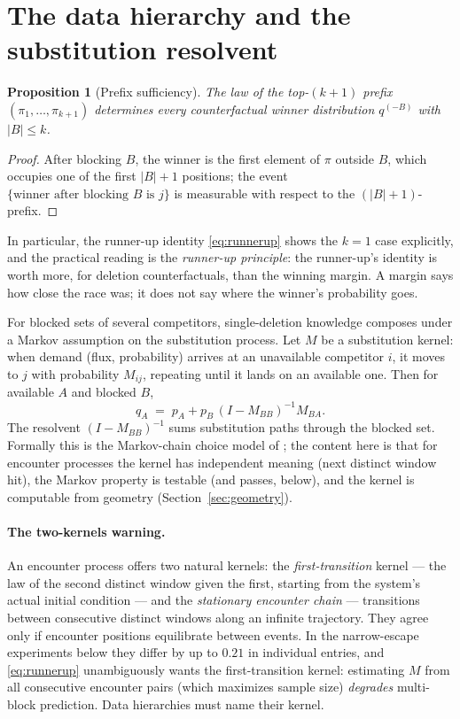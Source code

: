 \documentclass[11pt]{article}
\newtheorem{proposition}{Proposition}
\theoremstyle{remark}
\begin{document}
\section{The data hierarchy and the substitution resolvent}\label{sec:hierarchy}

\begin{proposition}[Prefix sufficiency]\label{prop:prefix}
The law of the top-$(k{+}1)$ prefix $(\pi_1, \dots, \pi_{k+1})$ determines every
counterfactual winner distribution $q^{(-B)}$ with $|B| \le k$.
\end{proposition}

\begin{proof}
After blocking $B$, the winner is the first element of $\pi$ outside $B$, which
occupies one of the first $|B|+1$ positions; the event
$\{\text{winner after blocking } B \text{ is } j\}$ is measurable with respect to
the $(|B|+1)$-prefix.
\end{proof}

In particular, the runner-up identity \eqref{eq:runnerup} shows the $k=1$ case
explicitly, and the practical reading is the \emph{runner-up principle}: the
runner-up's identity is worth more, for deletion counterfactuals, than the winning
margin. A margin says how close the race was; it does not say where the winner's
probability goes.

For blocked sets of several competitors, single-deletion knowledge composes under a
Markov assumption on the substitution process. Let $M$ be a substitution kernel:
when demand (flux, probability) arrives at an unavailable competitor $i$, it moves
to $j$ with probability $M_{ij}$, repeating until it lands on an available one. Then
for available $A$ and blocked $B$,
\begin{equation}
q_A \;=\; p_A + p_B\,(I - M_{BB})^{-1} M_{BA}.
\label{eq:resolvent}
\end{equation}
The resolvent $(I - M_{BB})^{-1}$ sums substitution paths through the blocked set.
Formally this is the Markov-chain choice model of \cite{blanchet2016}; the content
here is that for encounter processes the kernel has independent meaning (next
distinct window hit), the Markov property is testable (and passes, below), and the
kernel is computable from geometry (Section~\ref{sec:geometry}).

\paragraph{The two-kernels warning.} An encounter process offers two natural
kernels: the \emph{first-transition} kernel --- the law of the second distinct
window given the first, starting from the system's actual initial condition ---
and the \emph{stationary encounter chain} --- transitions between consecutive
distinct windows along an infinite trajectory. They agree only if encounter
positions equilibrate between events. In the narrow-escape experiments below they
differ by up to $0.21$ in individual entries, and \eqref{eq:runnerup} unambiguously
wants the first-transition kernel: estimating $M$ from all consecutive encounter
pairs (which maximizes sample size) \emph{degrades} multi-block prediction. Data
hierarchies must name their kernel.
\end{document}
